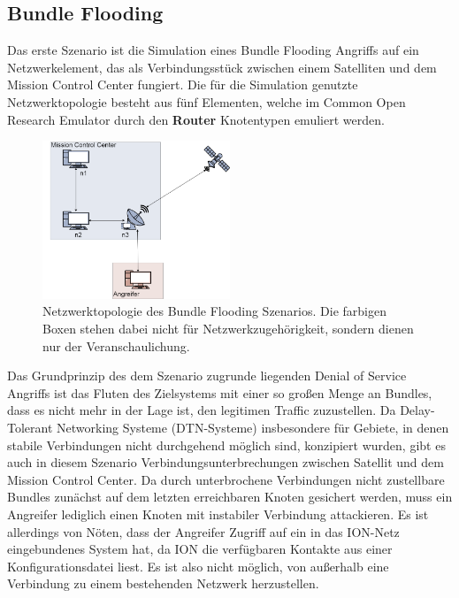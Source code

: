 \documentclass{article}
\begin{document}
\subsection{Bundle Flooding}
Das erste Szenario ist die Simulation eines Bundle Flooding Angriffs auf ein Netzwerkelement, das als Verbindungsstück zwischen einem Satelliten und dem Mission Control Center fungiert. Die für die Simulation genutzte Netzwerktopologie besteht aus fünf Elementen, welche im Common Open Research Emulator durch den \textbf{Router} Knotentypen emuliert werden.\par
\begin{figure}[h]
\centering
\includegraphics[width=0.5\textwidth]{flooding}
\caption{Netzwerktopologie des Bundle Flooding Szenarios. Die farbigen Boxen stehen dabei nicht für Netzwerkzugehörigkeit, sondern dienen nur der Veranschaulichung.}
\end{figure}
Das Grundprinzip des dem Szenario zugrunde liegenden Denial of Service Angriffs ist das Fluten des Zielsystems mit einer so großen Menge an Bundles, dass es nicht mehr in der Lage ist, den legitimen Traffic zuzustellen. Da Delay-Tolerant Networking Systeme (DTN-Systeme) insbesondere für Gebiete, in denen stabile Verbindungen nicht durchgehend möglich sind, konzipiert wurden, gibt es auch in diesem Szenario Verbindungsunterbrechungen zwischen Satellit und dem Mission Control Center. Da durch unterbrochene Verbindungen nicht zustellbare Bundles zunächst auf dem letzten erreichbaren Knoten gesichert werden, muss ein Angreifer lediglich einen Knoten mit instabiler Verbindung attackieren. Es ist allerdings von Nöten, dass der Angreifer Zugriff auf ein in das ION-Netz eingebundenes System hat, da ION die verfügbaren Kontakte aus einer Konfigurationsdatei liest. Es ist also nicht möglich, von außerhalb eine Verbindung zu einem bestehenden Netzwerk herzustellen.\par
\end{document}
